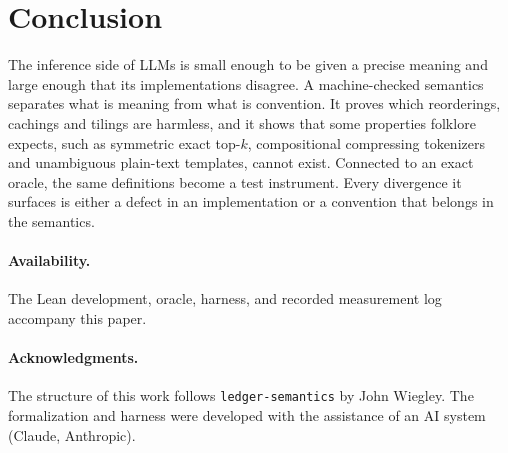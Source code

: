 \documentclass[10pt]{article}
\theoremstyle{qpt}
\begin{document}
\section{Conclusion}

The inference side of LLMs is small enough to be given a precise meaning and large
enough that its implementations disagree. A machine-checked semantics separates
what is meaning from what is convention. It proves which reorderings, cachings and
tilings are harmless, and it shows that some properties folklore expects, such as
symmetric exact top-$k$, compositional compressing tokenizers and unambiguous plain-text
templates, cannot exist. Connected to an exact oracle, the same definitions become
a test instrument. Every divergence it surfaces is either a defect in an
implementation or a convention that belongs in the semantics.

\paragraph{Availability.} The Lean development, oracle, harness, and recorded
measurement log accompany this paper.

\paragraph{Acknowledgments.} The structure of this work follows
\texttt{ledger-semantics} by John Wiegley. The formalization and harness were
developed with the assistance of an AI system (Claude, Anthropic).
\end{document}

